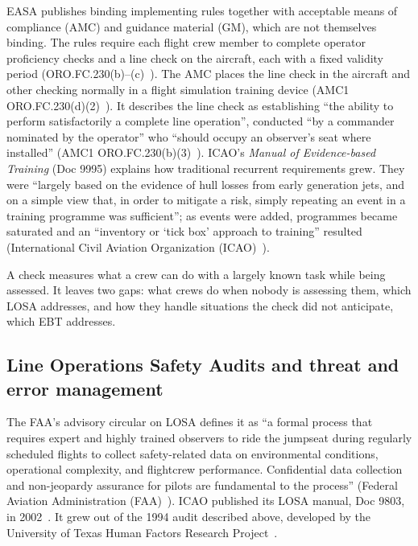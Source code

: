\documentclass[11pt]{article}
\begin{document}
EASA publishes binding implementing rules together with acceptable means of compliance (AMC) and guidance material (GM), which are not themselves binding. The rules require each flight crew member to complete operator proficiency checks and a line check on the aircraft, each with a fixed validity period (ORO.FC.230(b)--(c)~\cite{easa2026ear}). The AMC places the line check in the aircraft and other checking normally in a flight simulation training device (AMC1 ORO.FC.230(d)(2)~\cite{easa2026ear}). It describes the line check as establishing ``the ability to perform satisfactorily a complete line operation'', conducted ``by a commander nominated by the operator'' who ``should occupy an observer's seat where installed'' (AMC1 ORO.FC.230(b)(3)~\cite{easa2026ear}). ICAO's \emph{Manual of Evidence-based Training} (Doc 9995) explains how traditional recurrent requirements grew. They were ``largely based on the evidence of hull losses from early generation jets, and on a simple view that, in order to mitigate a risk, simply repeating an event in a training programme was sufficient''; as events were added, programmes became saturated and an ``inventory or `tick box' approach to training'' resulted (International Civil Aviation Organization (ICAO)~\cite[Part~I, 1.1]{icao2013ebt}).

A check measures what a crew can do with a largely known task while being assessed. It leaves two gaps: what crews do when nobody is assessing them, which LOSA addresses, and how they handle situations the check did not anticipate, which EBT addresses.

\subsection{Line Operations Safety Audits and threat and error management}\label{sec:losa}

The FAA's advisory circular on LOSA defines it as ``a formal process that requires expert and highly trained observers to ride the jumpseat during regularly scheduled flights to collect safety-related data on environmental conditions, operational complexity, and flightcrew performance. Confidential data collection and non-jeopardy assurance for pilots are fundamental to the process'' (Federal Aviation Administration (FAA)~\cite[para.~4a]{faa2006losa}). ICAO published its LOSA manual, Doc 9803, in 2002~\cite{icao2002losa}. It grew out of the 1994 audit described above, developed by the University of Texas Human Factors Research Project~\cite{klinect2003}.
\end{document}
